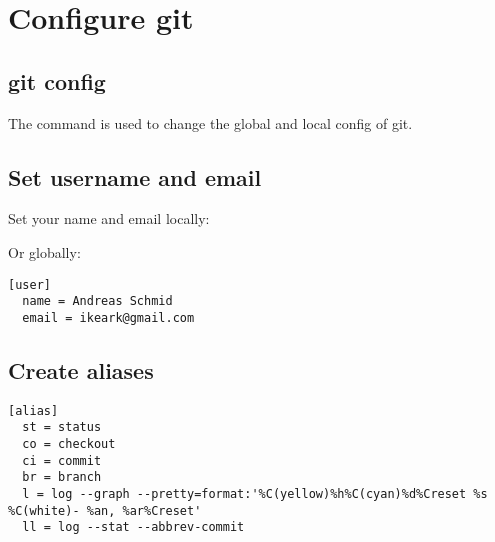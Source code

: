 \section{Configure git}
\begin{frame}[fragile]
  \slidetitle
\end{frame}

\subsection{git config}
\begin{frame}[fragile]
  \subslidetitle
  The command  is used to change the global and local config of git.
\end{frame}

\subsection{Set username and email}
\begin{frame}[fragile]
  \subslidetitle
  \vspace{1em}
  Set your name and email locally:
  \begin{itemize}
  \end{itemize}
  \vspace{1em}
  Or globally:
  \begin{itemize}
  \end{itemize}

\begin{lstlisting}
[user]
  name = Andreas Schmid
  email = ikeark@gmail.com
\end{lstlisting}
\end{frame}

\subsection{Create aliases}
\begin{frame}[fragile]
  \subslidetitle

\begin{lstlisting}
[alias]
  st = status
  co = checkout
  ci = commit
  br = branch
  l = log --graph --pretty=format:'%C(yellow)%h%C(cyan)%d%Creset %s %C(white)- %an, %ar%Creset'
  ll = log --stat --abbrev-commit
\end{lstlisting}
\end{frame}


